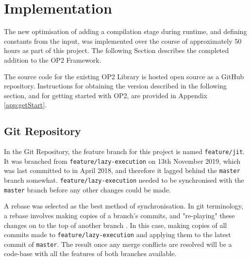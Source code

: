 
\section{Implementation}
\label{s:impl}
The new optimisation of adding a compilation stage during runtime, and defining constants from the input, was implemented over the course of approximately 50 hours as part of this project. The following Section describes the completed addition to the OP2 Framework.

The source code for the existing OP2 Library is hosted open source as a GitHub\cite{OP2rep} repository. Instructions for obtaining the version described in the following section, and for getting started with OP2, are provided in Appendix \ref{app:getStart}.
\subsection{Git Repository}
In the Git Repository, the feature branch for this project is named \verb|feature/jit|. It was branched from \verb|feature/lazy-execution| on 13th November 2019, which was last committed to in April 2018, and therefore it lagged behind the \verb|master| branch somewhat. \verb|feature/lazy-execution| needed to be synchronised with the \verb|master| branch before any other changes could be made.
\par
A rebase was selected as the best method of synchronisation. In git terminology, a rebase involves making copies of a branch's commits, and "re-playing" these changes on to the top of another branch \cite{scm-rebase}. In this case, making copies of all commits made to \verb|feature/lazy-execution| and applying them to the latest commit of \verb|master|. The result once any merge conflicts are resolved will be a code-base with all the features of both branches available.
